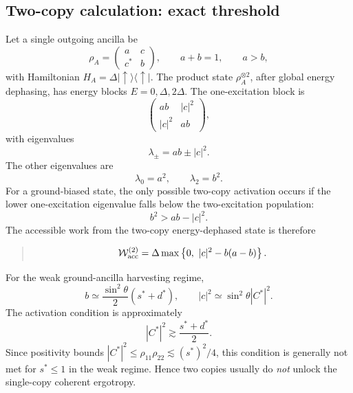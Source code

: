 \documentclass[11pt,a4paper]{article}
\newcommand{\proj}[1]{|#1\rangle\langle #1|}
\newcommand{\W}{\mathcal{W}}
\newenvironment{resultbox}{\begin{quote}\small}{\end{quote}}
\begin{document}
\subsection{Two-copy calculation: exact threshold}

Let a single outgoing ancilla be
\begin{equation}
\rho_A=\begin{pmatrix}a&c\\c^*&b\end{pmatrix},
\qquad
 a+b=1,
\qquad
 a>b,
\end{equation}
with Hamiltonian $H_A=\Delta\proj{\uparrow}$. The product state $\rho_A^{\otimes2}$, after global energy dephasing, has energy blocks $E=0,\Delta,2\Delta$. The one-excitation block is
\begin{equation}
\begin{pmatrix}ab&|c|^2\\ |c|^2&ab\end{pmatrix},
\end{equation}
with eigenvalues
\begin{equation}
\lambda_\pm=ab\pm |c|^2.
\end{equation}
The other eigenvalues are
\begin{equation}
\lambda_0=a^2,
\qquad
\lambda_2=b^2.
\end{equation}
For a ground-biased state, the only possible two-copy activation occurs if the lower one-excitation eigenvalue falls below the two-excitation population:
\begin{equation}
b^2>ab-|c|^2.
\end{equation}
The accessible work from the two-copy energy-dephased state is therefore
\begin{resultbox}
\begin{equation}
\W_{\rm acc}^{(2)}=\Delta\max\left\{0,\ |c|^2-b(a-b)\right\}.
\end{equation}
\end{resultbox}

For the weak ground-ancilla harvesting regime,
\begin{equation}
b\simeq \frac{\sin^2\theta}{2}(s^*+d^*),
\qquad
|c|^2\simeq \sin^2\theta |C^*|^2.
\end{equation}
The activation condition is approximately
\begin{equation}
|C^*|^2\gtrsim \frac{s^*+d^*}{2}.
\end{equation}
Since positivity bounds $|C^*|^2\le \rho_{11}\rho_{22}\lesssim (s^*)^2/4$, this condition is generally not met for $s^*\le1$ in the weak regime. Hence two copies usually do \emph{not} unlock the single-copy coherent ergotropy.
\end{document}
